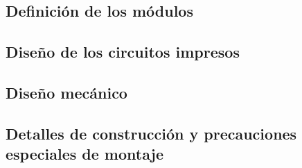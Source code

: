 

  \subsection{Definición de los módulos}  

  \newpage



  \subsection{Diseño de los circuitos impresos}  

  \newpage




  \subsection{Diseño mecánico}  

  \newpage



  \subsection{Detalles de construcción y precauciones especiales de montaje}  

  \newpage



